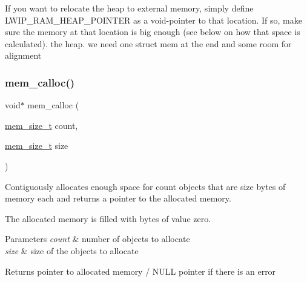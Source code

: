 If you want to relocate the heap to external memory, simply define L\+W\+I\+P\+\_\+\+R\+A\+M\+\_\+\+H\+E\+A\+P\+\_\+\+P\+O\+I\+N\+T\+ER as a void-\/pointer to that location. If so, make sure the memory at that location is big enough (see below on how that space is calculated). the heap. we need one struct mem at the end and some room for alignment \mbox{\label{openmote-cc2538_2lwip_2src_2core_2mem_8c_ab0bdc525971701883f2065e7fb257a24}} 
\subsubsection{\texorpdfstring{mem\+\_\+calloc()}{mem\_calloc()}}
{\footnotesize\ttfamily void$\ast$ mem\+\_\+calloc (\begin{DoxyParamCaption}\item[{\hyperlink{native_2lwip_2src_2include_2lwip_2mem_8h_a49bff6e5dd4cb95fe6dc0670962bbf54}{mem\+\_\+size\+\_\+t}}]{count,  }\item[{\hyperlink{native_2lwip_2src_2include_2lwip_2mem_8h_a49bff6e5dd4cb95fe6dc0670962bbf54}{mem\+\_\+size\+\_\+t}}]{size }\end{DoxyParamCaption})}

Contiguously allocates enough space for count objects that are size bytes of memory each and returns a pointer to the allocated memory.

The allocated memory is filled with bytes of value zero.


\begin{DoxyParams}{Parameters}
{\em count} & number of objects to allocate \\
\hline
{\em size} & size of the objects to allocate \\
\hline
\end{DoxyParams}
\begin{DoxyReturn}{Returns}
pointer to allocated memory / N\+U\+LL pointer if there is an error 
\end{DoxyReturn}
\mbox{\label{openmote-cc2538_2lwip_2src_2core_2mem_8c_a65169147c44e9db60d997819af9b455c}} 
